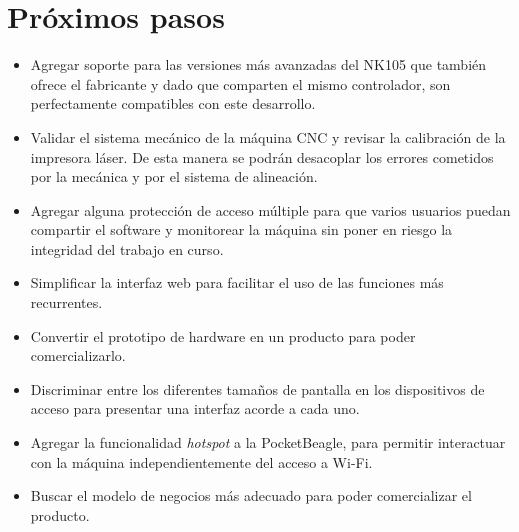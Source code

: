 \section{Próximos pasos}

\begin{itemize}
\item{Agregar soporte para las versiones más avanzadas del NK105 que también ofrece el fabricante y dado que comparten el mismo controlador, son perfectamente compatibles con este desarrollo.}

\item{Validar el sistema mecánico de la máquina CNC y revisar la calibración de la impresora láser. De esta manera se podrán desacoplar los errores cometidos por la mecánica y por el sistema de alineación.}

\item{Agregar alguna protección de acceso múltiple para que varios usuarios puedan compartir el software y monitorear la máquina sin poner en riesgo la integridad del trabajo en curso.}

\item{Simplificar la interfaz web para facilitar el uso de las funciones más recurrentes.}

\item{Convertir el prototipo de hardware en un producto para poder comercializarlo.}

\item{Discriminar entre los diferentes tamaños de pantalla en los dispositivos de acceso para presentar una interfaz acorde a cada uno.}

\item{Agregar la funcionalidad \textit{hotspot} a la PocketBeagle, para permitir interactuar con la máquina independientemente del acceso a Wi-Fi.}

\item{Buscar el modelo de negocios más adecuado para poder comercializar el producto.}

\end{itemize}
